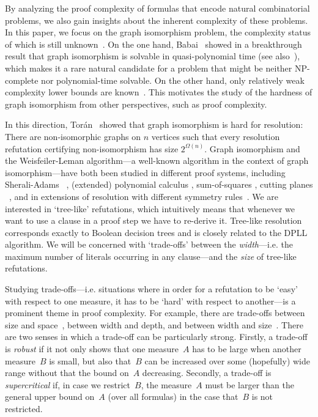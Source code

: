 \documentclass[a4paper,english, thm-restate]{lipics-v2021}
\begin{document}
By analyzing the proof complexity of formulas that encode natural
combinatorial problems, we also gain insights about the inherent complexity of
these problems. In this paper, we focus on the graph isomorphism problem, the 
complexity status of which is still unknown~\cite{DBLP:conf/coco/Karp72}.
On the one hand, Babai~\cite{Babai2016} showed in a breakthrough result that graph isomorphism is solvable in quasi-polynomial time (see also~\cite{DBLP:conf/bcc/GroheN21}),
which makes it a rare natural candidate for a problem that might be neither NP-complete nor polynomial-time solvable.
On the other hand, only relatively weak complexity lower bounds are known~\cite{Toran04}.
This motivates the study of the hardness of graph isomorphism from other perspectives, such as proof complexity.

In this direction,
Torán~\cite{DBLP:conf/sat/Toran13} showed that graph isomorphism is hard for resolution:
There are non-isomorphic graphs on $n$ vertices such that every resolution refutation certifying non-isomorphism has size
$2^{\Omega(n)}$.
Graph isomorphism and the Weisfeiler-Leman algorithm---a well-known algorithm in the context of graph isomorphism---have both  been studied in different proof systems, including
 Sherali-Adams%
~\cite{DBLP:journals/siamcomp/AtseriasM13,
        DBLP:journals/jsyml/GroheO15},
(extended) polynomial
calculus
\cite{DBLP:conf/icalp/BerkholzG15,DBLP:conf/soda/BerkholzG17, Pago2023},
sum-of-squares %
\cite{DBLP:conf/soda/ODonnellWWZ14},
cutting planes%
~\cite{DBLP:conf/sat/ToranW23},
and in extensions of resolution with different symmetry rules~\cite{SchweitzerSeebach21, DBLP:conf/sat/ToranW23}.
%
We are interested in `tree-like' refutations, which intuitively means
that whenever we want to use a clause in a proof step we have to
re-derive it. Tree-like resolution corresponds exactly to Boolean
decision trees and is closely related to the DPLL
algorithm. We will be concerned with `trade-offs' between the \emph{width}---i.e. the maximum number of literals occurring in any clause---and the \emph{size} of tree-like refutations. 

Studying trade-offs---i.e.\! situations where in order for a refutation to be `easy' with respect to one measure, it has to be `hard' with respect to another---is a prominent theme in proof complexity. 
 For example, there are trade-offs between size and space~\cite{BeameBeckImpagliazzo2016,BenSassonNordstrom2011},
between width and depth, and between width and size~\cite{Berkholz2012, BerkholzNordstrom2020, Thapen2016}.
There are two senses in which a trade-off can be particularly strong. Firstly, a trade-off is \emph{robust}
if it not only shows that one measure~$A$ has to be large
when another measure~$B$ is small,
but also that~$B$ can be increased over some (hopefully) wide range
without that the bound on~$A$ decreasing.
Secondly, a trade-off is \emph{supercritical}
if, in case we restrict~$B$,
the measure~$A$ must be larger than the general upper bound on~$A$ (over all formulas) in the case that~$B$ is not restricted.
\end{document}
